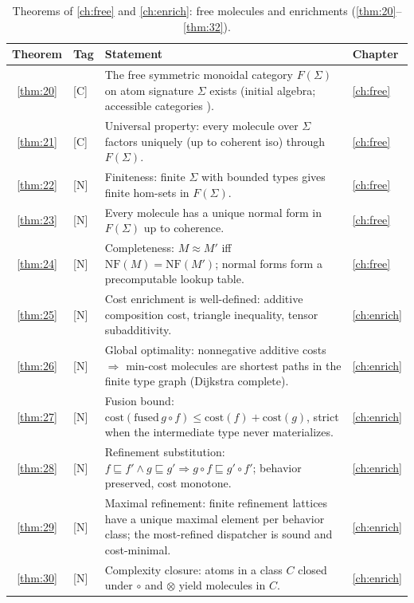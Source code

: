 \begin{table}[!htbp]
\centering
\caption{Theorems of \autoref{ch:free} and \autoref{ch:enrich}: free molecules and enrichments (\autoref{thm:20}--\autoref{thm:32}).}
\label{tab:thm-free-enrich}
\small
\begin{tabular}{@{}clp{7.2cm}l@{}}
\toprule
Theorem & Tag & Statement & Chapter\\
\midrule
\ref{thm:20} & [C] & The free symmetric monoidal category $F (\Sigma)$ on atom signature $\Sigma$ exists (initial algebra; accessible categories \cite{adamek}). & \autoref{ch:free}\\
\ref{thm:21} & [C] & Universal property: every molecule over $\Sigma$ factors uniquely (up to coherent iso) through $F (\Sigma)$. & \autoref{ch:free}\\
\ref{thm:22} & [N] & Finiteness: finite $\Sigma$ with bounded types gives finite hom-sets in $F (\Sigma)$. & \autoref{ch:free}\\
\ref{thm:23} & [N] & Every molecule has a unique normal form in $F (\Sigma)$ up to coherence. & \autoref{ch:free}\\
\ref{thm:24} & [N] & Completeness: $M \approx M'$ iff $\mathrm{NF} (M) = \mathrm{NF} (M')$; normal forms form a precomputable lookup table. & \autoref{ch:free}\\
\ref{thm:25} & [N] & Cost enrichment is well-defined: additive composition cost, triangle inequality, tensor subadditivity. & \autoref{ch:enrich}\\
\ref{thm:26} & [N] & Global optimality: nonnegative additive costs $\Rightarrow$ min-cost molecules are shortest paths in the finite type graph (Dijkstra complete). & \autoref{ch:enrich}\\
\ref{thm:27} & [N] & Fusion bound: $\mathrm{cost} (\mathrm{fused}\, g\circ f) \le \mathrm{cost} (f)+\mathrm{cost} (g)$, strict when the intermediate type never materializes. & \autoref{ch:enrich}\\
\ref{thm:28} & [N] & Refinement substitution: $f \sqsubseteq f' \wedge g \sqsubseteq g' \Rightarrow g\circ f \sqsubseteq g'\circ f'$; behavior preserved, cost monotone. & \autoref{ch:enrich}\\
\ref{thm:29} & [N] & Maximal refinement: finite refinement lattices have a unique maximal element per behavior class; the most-refined dispatcher is sound and cost-minimal. & \autoref{ch:enrich}\\
\ref{thm:30} & [N] & Complexity closure: atoms in a class $C$ closed under $\circ$ and $\otimes$ yield molecules in $C$. & \autoref{ch:enrich}\\

\end{tabular}
\end{table}
